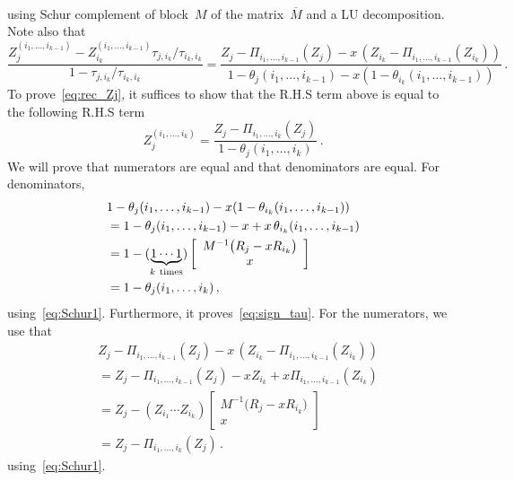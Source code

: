\documentclass[final,numbib]{imaiai}%
\numberwithin{equation}{section}
\renewcommand{\bar}{\overline}
\def\\bUnif{\text{\bUnif}}
\newcommand{\<}{\langle}
\renewcommand{\>}{\rangle}
\newcommand{\1}{\mathds{1}}
\begin{document}
{\begin{align}
\label{eq:Schur1}
\end{align}
using Schur complement of block~$M$ of the matrix~$\bar M$ and a LU decomposition. Note also that
\[
\frac{Z^{(i_1,\ldots, i_{k-1})}_j-Z^{(i_1,\ldots, i_{k-1})}_{i_k}\tau_{j,i_k}/\tau_{i_k,i_k}}
{1-\tau_{j,i_k}/\tau_{i_k,i_k}}
=\frac
{Z_j-\Pi_{ i_1,\ldots, i_{k-1}} (Z_j)-x\,(Z_{i_k}-\Pi_{ i_1,\ldots, i_{k-1}} (Z_{i_k}))}
{1-\theta_j(i_1,\ldots, i_{k-1})-x(1-\theta_{i_k}(i_1,\ldots, i_{k-1}))}\,.
\]
To prove~\eqref{eq:rec_Zj}, it suffices to show that the R.H.S term  above is equal to the following R.H.S term
\[
Z^{(i_1,\ldots, i_{k})}_j=
\frac{Z_j-\Pi_{ i_1,\ldots, i_{k}} (Z_j)}
{1-\theta_j(i_1,\ldots, i_{k})}\,.
\]
We will prove that numerators are equal and that denominators are equal. For denominators, %
\begin{align}
&1-\theta_j(i_1,\ldots, i_{k-1})-x(1-\theta_{i_k}(i_1,\ldots, i_{k-1}))\notag\\
&=1-\theta_j(i_1,\ldots, i_{k-1})-x+x\,\theta_{i_k}(i_1,\ldots, i_{k-1})\notag\\
&=1-(\underbrace{1\cdots 1}_{k\ \mathrm{times}})
\left[\begin{array}{c}M^{-1}\big(R_j-xR_{i_k}\big) \\ x\end{array}\right]\notag\\
&=1-\theta_j(i_1,\ldots, i_{k})\label{eq:rec101}\,,
\end{align}
using~\eqref{eq:Schur1}. Furthermore, it proves~\eqref{eq:sign_tau}. For the numerators, we use that
\begin{align*}
&Z_j-\Pi_{ i_1,\ldots, i_{k-1}} (Z_j)-x\,(Z_{i_k}-\Pi_{ i_1,\ldots, i_{k-1}} (Z_{i_k}))\\
&=Z_j-\Pi_{ i_1,\ldots, i_{k-1}} (Z_j)-x Z_{i_k}+ x \Pi_{ i_1,\ldots, i_{k-1}} (Z_{i_k})\\
&=Z_j-(Z_{i_1}\cdots Z_{i_k})
\left[\begin{array}{c}M^{-1}\big(R_j-xR_{i_k}\big) \\ x\end{array}\right]\\
&=Z_j-\Pi_{ i_1,\ldots, i_{k}} (Z_j)\,.
\end{align*}
using~\eqref{eq:Schur1}.



}
\end{document}
